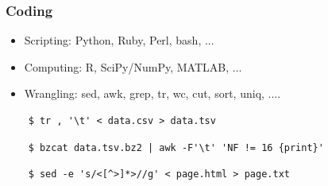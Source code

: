 \documentclass[xcolor=dvipsnames, 9pt]{beamer}
\begin{document}
\begin{frame}[fragile]
  \frametitle{Coding}

  \begin{itemize}
    \item Scripting: Python, Ruby, Perl, bash, ...
    \item Computing: R, SciPy/NumPy, MATLAB, ...
    \item Wrangling: sed, awk, grep, tr, wc, cut, sort, uniq, ....
  \end{itemize}

  \pause
  \begin{verbatim}
    $ tr , '\t' < data.csv > data.tsv
  \end{verbatim}

  \pause
  \begin{verbatim}
    $ bzcat data.tsv.bz2 | awk -F'\t' 'NF != 16 {print}'
  \end{verbatim}

  \pause
  \begin{verbatim}
    $ sed -e 's/<[^>]*>//g' < page.html > page.txt
  \end{verbatim}


\end{frame}

\end{document}
